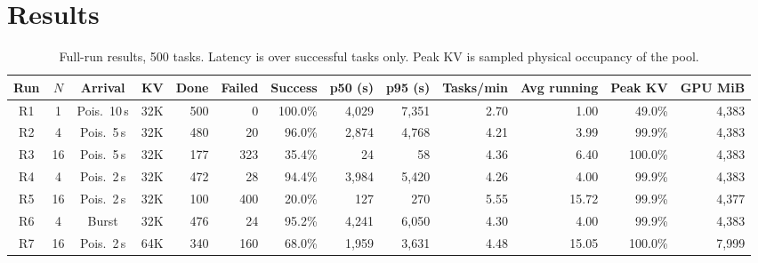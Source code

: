 \documentclass[10pt,twocolumn,letterpaper]{article}
\begin{document}
\section{Results}
\begin{table}[t]
\centering\small
\caption{Full-run results, 500 tasks. Latency is over successful tasks only. Peak KV is sampled physical occupancy of the pool.}
\label{tab:full}
\setlength{\tabcolsep}{4.5pt}
\begin{tabular}{@{}cccc rrr rr r r rr@{}}
\toprule
Run & $N$ & Arrival & KV & Done & Failed & Success & p50 (s) & p95 (s) & Tasks/min & Avg running & Peak KV & GPU MiB\\
\midrule
R1 & 1 & Pois.\ 10\,s & 32K & 500 & 0 & 100.0\% & 4{,}029 & 7{,}351 & 2.70 & 1.00 & 49.0\% & 4{,}383\\
R2 & 4 & Pois.\ 5\,s & 32K & 480 & 20 & 96.0\% & 2{,}874 & 4{,}768 & 4.21 & 3.99 & 99.9\% & 4{,}383\\
R3 & 16 & Pois.\ 5\,s & 32K & 177 & 323 & 35.4\% & 24 & 58 & 4.36 & 6.40 & 100.0\% & 4{,}383\\
R4 & 4 & Pois.\ 2\,s & 32K & 472 & 28 & 94.4\% & 3{,}984 & 5{,}420 & 4.26 & 4.00 & 99.9\% & 4{,}383\\
R5 & 16 & Pois.\ 2\,s & 32K & 100 & 400 & 20.0\% & 127 & 270 & 5.55 & 15.72 & 99.9\% & 4{,}377\\
R6 & 4 & Burst & 32K & 476 & 24 & 95.2\% & 4{,}241 & 6{,}050 & 4.30 & 4.00 & 99.9\% & 4{,}383\\
R7 & 16 & Pois.\ 2\,s & 64K & 340 & 160 & 68.0\% & 1{,}959 & 3{,}631 & 4.48 & 15.05 & 100.0\% & 7{,}999\\
\bottomrule
\end{tabular}
\end{table}
\end{document}
